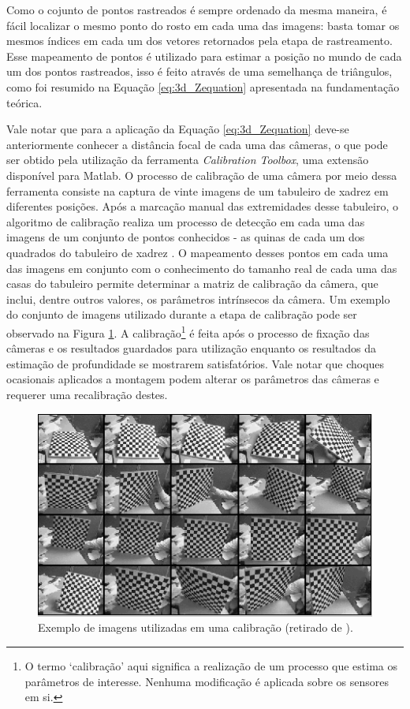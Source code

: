Como o cojunto de pontos rastreados é sempre ordenado da mesma maneira, é fácil
localizar o mesmo ponto do rosto em cada uma das imagens: basta tomar os mesmos
índices em cada um dos vetores retornados pela etapa de rastreamento. Esse
mapeamento de pontos é utilizado para estimar a posição no mundo de cada um dos
pontos rastreados, isso é feito através de uma semelhança de triângulos, como
foi resumido na Equação \ref{eq:3d_Zequation} apresentada na fundamentação
teórica.

Vale notar que para a aplicação da Equação \ref{eq:3d_Zequation} deve-se
anteriormente conhecer a distância focal de cada uma das câmeras, o que pode ser
obtido pela utilização da ferramenta \textit{Calibration Toolbox}, uma extensão
disponível para Matlab. O processo de calibração de uma câmera por meio dessa
ferramenta consiste na captura de vinte imagens de um tabuleiro de xadrez em
diferentes posições. Após a marcação manual das extremidades desse tabuleiro, o
algoritmo de calibração realiza um processo de detecção em cada uma das imagens
de um conjunto de pontos conhecidos - as quinas de cada um dos quadrados do
tabuleiro de xadrez . O mapeamento desses pontos em cada uma das imagens em
conjunto com o conhecimento do tamanho real de cada uma das casas do tabuleiro
permite determinar a matriz de calibração da câmera, que inclui, dentre outros
valores, os parâmetros intrínsecos da câmera. Um exemplo do conjunto de imagens
utilizado durante a etapa de calibração pode ser observado na Figura
\ref{fig:calib_imagens}.  A calibração\footnote{O termo `calibração' aqui
significa a realização de um processo que estima os parâmetros de interesse.
Nenhuma modificação é aplicada sobre os sensores em si.} é feita após o processo
de fixação das câmeras e os resultados guardados para utilização enquanto os
resultados da estimação de profundidade se mostrarem satisfatórios. Vale notar
que choques ocasionais aplicados a montagem podem alterar os parâmetros das
câmeras e requerer uma recalibração destes. 

\begin{figure}[h!]
\centering
\includegraphics[width=.6\linewidth]{figs/TG_calib_images.png}
\caption{Exemplo de imagens utilizadas em uma calibração (retirado de \cite{bouguetML}).}
\label{fig:calib_imagens}
\end{figure}

